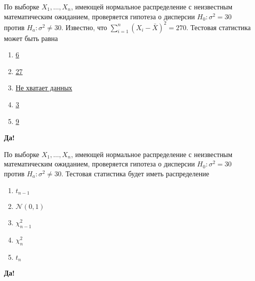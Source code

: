 \documentclass[t]{beamer}
\newcommand{\cN}{\mathcal{N}}
\begin{document}
 \begin{frame} \label{41-Yes} 
\begin{block}{41} 

По выборке $X_1,\ldots,X_{n}$, имеющей нормальное распределение с неизвестным математическим ожиданием, проверяется гипотеза о дисперсии $H_0: \sigma^2 = 30$ против $H_a: \sigma^2 \ne 30$. Известно, что $\sum_{i=1}^{n} (X_i - \bar{X})^2 = 270$. Тестовая статистика может быть равна


 \end{block} 
\begin{enumerate} 
\item[] \hyperlink{41-No}{\beamergotobutton{} 6}
\item[] \hyperlink{41-No}{\beamergotobutton{} 27}
\item[] \hyperlink{41-No}{\beamergotobutton{} Не хватает данных}
\item[] \hyperlink{41-No}{\beamergotobutton{} 3}
\item[] \hyperlink{41-Yes}{\beamergotobutton{} 9}
\end{enumerate} 

 \textbf{Да!} 
 \hyperlink{42}{}\end{frame} 


 \begin{frame} \label{42-Yes} 
\begin{block}{42} 

По выборке $X_1,\ldots,X_{n}$, имеющей нормальное распределение с неизвестным математическим ожиданием, проверяется гипотеза о дисперсии $H_0: \sigma^2 = 30$ против $H_a: \sigma^2 \ne 30$. Тестовая статистика будет иметь распределение


 \end{block} 
\begin{enumerate} 
\item[] \hyperlink{42-No}{\beamergotobutton{} $t_{n-1}$}
\item[] \hyperlink{42-No}{\beamergotobutton{} $\cN(0,1)$}
\item[] \hyperlink{42-Yes}{\beamergotobutton{} $\chi^2_{n-1}$}
\item[] \hyperlink{42-No}{\beamergotobutton{} $\chi^2_n$}
\item[] \hyperlink{42-No}{\beamergotobutton{} $t_n$}
\end{enumerate} 

 \textbf{Да!} 
 \hyperlink{43}{}\end{frame} 
\end{document}
